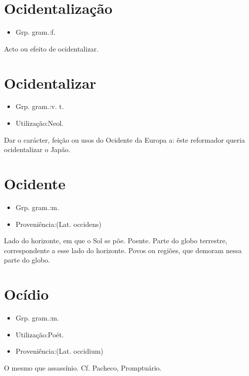 \section{Ocidentalização}
\begin{itemize}
\item {Grp. gram.:f.}
\end{itemize}
Acto ou efeito de \textunderscore ocidentalizar\textunderscore .
\section{Ocidentalizar}
\begin{itemize}
\item {Grp. gram.:v. t.}
\end{itemize}
\begin{itemize}
\item {Utilização:Neol.}
\end{itemize}
Dar o carácter, feição ou usos do Ocidente da Europa a: \textunderscore êste reformador queria ocidentalizar o Japão\textunderscore .
\section{Ocidente}
\begin{itemize}
\item {Grp. gram.:m.}
\end{itemize}
\begin{itemize}
\item {Proveniência:(Lat. \textunderscore occidens\textunderscore )}
\end{itemize}
Lado do horizonte, em que o Sol se põe.
Poente.
Parte do globo terrestre, correspondente a esse lado do horizonte.
Povos ou regiões, que demoram nessa parte do globo.
\section{Ocídio}
\begin{itemize}
\item {Grp. gram.:m.}
\end{itemize}
\begin{itemize}
\item {Utilização:Poét.}
\end{itemize}
\begin{itemize}
\item {Proveniência:(Lat. \textunderscore occidium\textunderscore )}
\end{itemize}
O mesmo que \textunderscore assassínio\textunderscore . Cf. Pacheco, \textunderscore Promptuário\textunderscore .
